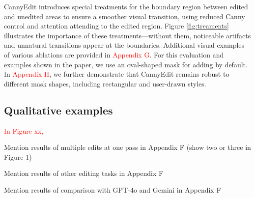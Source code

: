 \documentclass{article}
\begin{document}



CannyEdit introduces special treatments for the boundary region between edited and unedited areas to ensure a smoother visual transition, using reduced Canny control and attention attending to the edited region. Figure \ref{fig:treaments} illustrates the importance of these treatments—without them, noticeable artifacts and unnatural transitions appear at the boundaries. Additional visual examples of various ablations are provided in \textcolor{red}{Appendix G}. For this evaluation and examples shown in the paper, we use an oval-shaped mask for adding by default. In \textcolor{red}{Appendix H}, we further demonstrate that CannyEdit remains robust to different mask shapes, including rectangular and user-drawn styles.

\subsection{Qualitative examples}

\textcolor{red}{In Figure xx, }





Mention results of multiple edits at one pass in Appendix F (show two or three in Figure 1)

Mention results of other editing tasks in Appendix F

Mention results of comparison with GPT-4o and Gemini in Appendix F








\end{document}
